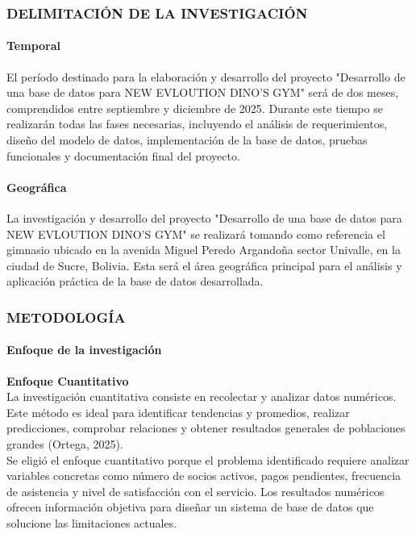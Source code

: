 \documentclass[12pt, letterpaper]{article}
\begin{document}
\subsubsection{DELIMITACIÓN DE LA INVESTIGACIÓN}
\paragraph{Temporal}
El período destinado para la elaboración y desarrollo del proyecto "Desarrollo de una base de datos para NEW EVLOUTION DINO'S GYM" será de dos meses, comprendidos entre septiembre y diciembre de 2025. Durante este tiempo se realizarán todas las fases necesarias, incluyendo el análisis de requerimientos, diseño del modelo de datos, implementación de la base de datos, pruebas funcionales y documentación final del proyecto.

\paragraph{Geográfica}
La investigación y desarrollo del proyecto "Desarrollo de una base de datos para NEW EVLOUTION DINO'S GYM" se realizará tomando como referencia el gimnasio ubicado en la avenida Miguel Peredo Argandoña sector Univalle, en la ciudad de Sucre, Bolivia. Esta será el área geográfica principal para el análisis y aplicación práctica de la base de datos desarrollada.
\newpage

\subsubsection{METODOLOGÍA}
\paragraph{Enfoque de la investigación}
\textbf{Enfoque Cuantitativo}\\
La investigación cuantitativa consiste en recolectar y analizar datos numéricos. Este método es ideal para identificar tendencias y promedios, realizar predicciones, comprobar relaciones y obtener resultados generales de poblaciones grandes (Ortega, 2025).\\
Se eligió el enfoque cuantitativo porque el problema identificado requiere analizar variables concretas como número de socios activos, pagos pendientes, frecuencia de asistencia y nivel de satisfacción con el servicio. Los resultados numéricos ofrecen información objetiva para diseñar un sistema de base de datos que solucione las limitaciones actuales.
\end{document}
